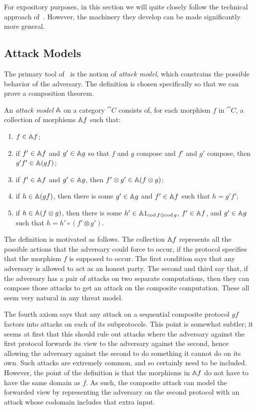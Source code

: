 For expository purposes, in this section we will quite closely follow the
technical approach of~\cite{broadbent-karvonen-2022}. However, the machinery
they develop can be made significantly more general.

\subsection{Attack Models}
\label{sec:attack-models}

The primary tool of~\cite{broadbent-karvonen-2022} is the notion of \emph{attack
model}, which constrains the possible behavior of the adversary. The definition
is chosen specifically so that we can prove a composition theorem.

\begin{dfn}
  An \emph{attack model} $\AA$ on a category $\cat{C}$ consists of, for each morphism
  $f$ in $\cat{C}$, a collection of morphisms $\AA f$ such that:
  \begin{enumerate}
    \item \label{item:am-id} $f\in \AA f$;
    \item \label{item:am-seq-comp} if $f'\in\AA f$ and $g'\in\AA g$ so that $f$ and $g$ compose and $f'$
      and $g'$ compose, then $g'f'\in\AA (gf)$;
    \item \label{item:am-con-comp} if $f'\in\AA f$ and $g'\in\AA g$, then $f'\otimes g'\in\AA (f\otimes
      g)$;
    \item \label{item:am-seq-fact} if $h\in\AA (gf)$, then there is some $g'\in\AA g$ and $f'\in\AA f$ such
      that $h = g'f'$;
    \item \label{item:am-con-fact} if $h\in\AA (f\otimes g)$, then there is some $h'\in\AA 1_{\cod
      f\otimes\cod g}$, $f'\in\AA f$, and $g'\in\AA g$ such that $h = h'\circ
      (f'\otimes g')$.
  \end{enumerate}
\end{dfn}

The definition is motivated as follows. The collection $\AA f$ represents all
the possible actions that the adversary could force to occur, if the protocol
specifies that the morphism $f$ is supposed to occur. The first condition says
that any adversary is allowed to act as an honest party. The second and third
say that, if the adversary has a pair of attacks on two separate computations,
then they can compose those attacks to get an attack on the composite
computation. These all seem very natural in any threat model.

The fourth axiom says that any attack on a sequential composite protocol $gf$
factors into attacks on each of its subprotocols. This point is somewhat
subtler; it seems at first that this should rule out attacks where the adversary
against the first protocol forwards its view to the adversary against the second,
hence allowing the adversary against the second to do something it cannot do on
its own. Such attacks are extremely common, and so certainly need to be
included. However, the point of the definition is that the morphisms in $\AA f$
do not have to have the same domain as $f$. As such, the composite attack can
model the forwarded view by representing the adversary on the second protocol
with an attack whose codomain includes that extra input.

